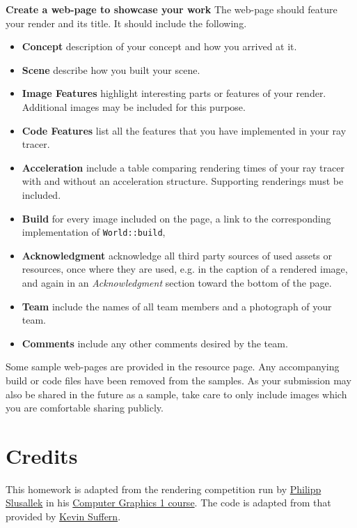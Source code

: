 \documentclass[addpoints]{exam}
\begin{document}
\begin{questions}
  \textbf{Create a web-page to showcase your work} The web-page should feature your render and its title. It should include the following.
    \begin{itemize}
    \item \textbf{Concept} description of your concept and how you arrived at it.
    \item \textbf{Scene} describe how you built your scene.
    \item \textbf{Image Features} highlight interesting parts or features of your render. Additional images may be included for this purpose.
    \item \textbf{Code Features} list all the features that you have implemented in your ray tracer.
    \item \textbf{Acceleration} include a table comparing rendering times of your ray tracer with and without an acceleration structure. Supporting renderings must be included.
    \item \textbf{Build} for every image included on the page, a link to the corresponding implementation of {\tt World::build},
    \item \textbf{Acknowledgment} acknowledge all third party sources of used assets or resources, once where they are used, e.g. in the caption of a rendered image, and again in an \textit{Acknowledgment} section toward the bottom of the page.
    \item \textbf{Team} include the names of all team members and a photograph of your team.
    \item \textbf{Comments} include any other comments desired by the team.
    \end{itemize}

  Some sample web-pages are provided in the resource page. Any accompanying build or code files have been removed from the samples. As your submission may also be shared in the future as a sample, take care to only include images which you are comfortable sharing publicly.
  
\end{questions}

\section*{Credits}

This homework is adapted from the rendering competition run by \href{https://graphics.cg.uni-saarland.de/people/slusallek.html}{Philipp Slusallek} in his \href{https://graphics.cg.uni-saarland.de/courses/cg1-2020/}{Computer Graphics 1 course}. The code is adapted from that provided by \href{http://www.raytracegroundup.com/}{Kevin Suffern}.
\end{document}
